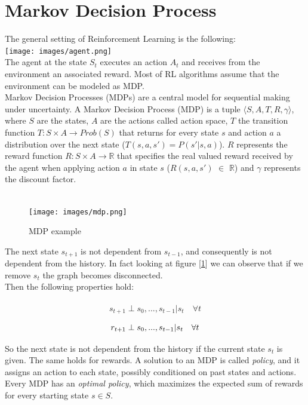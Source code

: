 \documentclass{article}
\begin{document}
\section { Markov Decision Process}
The general setting of Reinforcement Learning is the following:\\

\texttt{[image: images/agent.png]}
\noindent\\
The agent at the state $S_t$ executes an action $A_t$ and receives from the environment an associated reward.
Most of RL algorithms assume that the environment can be modeled as MDP.\\
Markov Decision Processes (MDPs) are a central model for sequential making under uncertainty.
A Markov Decision Process (MDP) is a tuple $\langle S,A,T,R,\gamma \rangle$, where $S$ are the states, $A$ are the actions called action space,  $T$ the transition function $T: S \times A \longrightarrow Prob(S)$ that returns for every state $s$ and action $a$ a distribution over the next state ($T(s,a,s')=P(s'|s,a)$). $R$ represents the reward function $R: S \times A \longrightarrow \mathbb{R}$ that specifies the real valued reward received by the agent when applying action $a$  in state $s$ ($R(s,a,s')$ $\in$ $\mathbb{R}$)  and $\gamma$ represents the discount factor.\\\\
\begin{figure}[h!]
    \centering
    \texttt{[image: images/mdp.png]}
    \caption{MDP example}
    \label{fig:mdp}
\end{figure}

\noindent 
The next state $s_{t+1}$ is not dependent from $s_{t-1}$, and consequently is not dependent from the history.
In fact looking at figure [\ref{fig:mdp}] we can observe that if we remove $s_t$ the graph becomes disconnected.\\
Then the following properties hold:\\\\
\begin{equation}
\label{one}
s_{t+1}  \perp  s_0, . . . , s_{t-1} | s_t \quad \forall t
\end{equation}

\begin{equation}
\label{two}
r_{t+1} \perp  s_0, . . . , s_{t-1}| s_t \quad \forall t\\
\end{equation}

\noindent


\noindent
So the next state is not dependent from the history if the current state $s_t$ is given. The same holds for rewards.
A solution to an MDP is called \textit{policy}, and it assigns an action to each state, possibly conditioned on past states and actions.
Every MDP has an \textit{optimal policy}, which maximizes the expected sum of rewards for every starting state $s \in S$.
\end{document}
